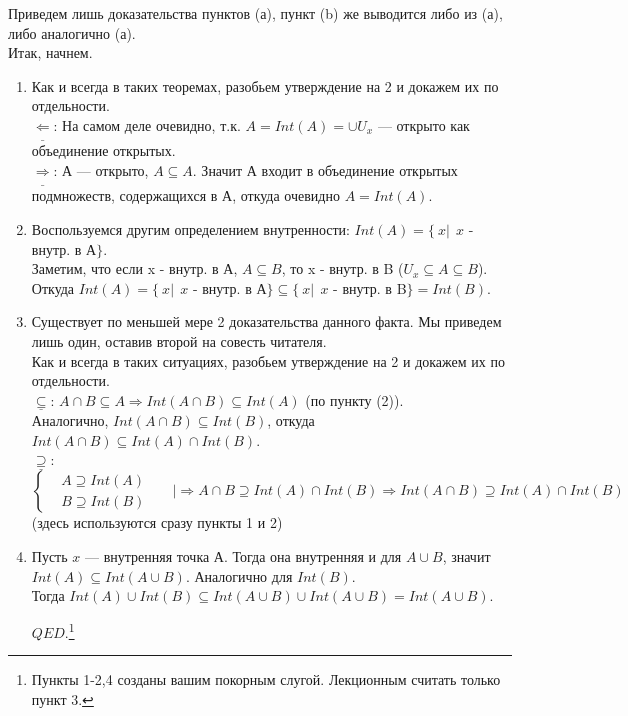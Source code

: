\documentclass[10pt]{report}
\begin{document}
\begin{spacing}{1.5}
\begin{enumerate}
\begin{enumerate}
\end{enumerate}
\end{enumerate}
Приведем лишь доказательства пунктов (а), пункт (b) же выводится либо из (а), либо аналогично (а).
\\ Итак, начнем.
\begin{enumerate}
\item Как и всегда в таких теоремах, разобьем утверждение на 2 и докажем их по отдельности.
\\ $\underline{\Leftarrow}$: На самом деле очевидно, т.к. $A = Int(A) = \cup U_{x}$ --- открыто как объединение открытых.
\\ $\underline{\Rightarrow}$: А --- открыто, $A\subseteq A$. Значит А входит в объединение открытых подмножеств, содержащихся в А, откуда очевидно $A = Int(A)$.
\item Воспользуемся другим определением внутренности: $Int(A) = \lbrace~x|~~x$ - внутр. в А$\rbrace$.
\\ Заметим, что если x - внутр. в А, $A\subseteq B$, то x - внутр. в B ($U_{x}\subseteq A\subseteq B$). Откуда $Int(A) = \lbrace~x|~~x$ - внутр. в А$\rbrace\subseteq\lbrace~x|~~x$ - внутр. в B$\rbrace=Int(B)$.
\item Существует по меньшей мере 2 доказательства данного факта. Мы приведем лишь один, оставив второй на совесть читателя.
\\ Как и всегда в таких ситуациях, разобьем утверждение на 2 и докажем их по отдельности.
\\ $\underline{\subseteq}$: $A\cap B\subseteq A\Longrightarrow Int(A\cap B)\subseteq Int(A)$ (по пункту (2)).
\\Аналогично,  $Int(A\cap B)\subseteq Int(B)$, откуда $Int(A\cap B)\subseteq Int(A)\cap Int(B)$.
\\ $\underline{\supseteq}$: \begin{equation*}
\begin{cases}
    & A\supseteq Int(A)\\
    & B\supseteq Int(B)
 \end{cases}~~~~~~~|\Longrightarrow A\cap B \supseteq Int(A)\cap Int(B)\Longrightarrow Int(A\cap B)\supseteq Int(A)\cap Int(B)
\end{equation*}
(здесь используются сразу пункты 1 и 2)
\item Пусть $x$ --- внутренняя точка А. Тогда она внутренняя и для $A\cup B$, значит $Int(A)\subseteq Int(A\cup B)$. Аналогично для $Int(B)$.
\\ Тогда $Int(A)\cup Int(B)\subseteq Int(A\cup B)\cup Int(A\cup B)=Int(A\cup B)$.
 \begin{flushright}
$QED.$\footnote{Пункты 1-2,4 созданы вашим покорным слугой. Лекционным считать только пункт 3.}
\end{flushright}
\end{enumerate}

\end{spacing}
\end{document}
